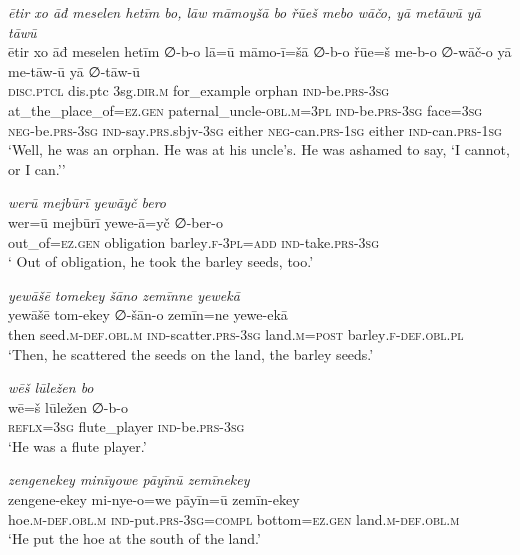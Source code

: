 \ea \label{ŽP.28}
\textit{ētir xo āđ meselen hetīm bo, lāw māmoyšā bo řūeš mebo wāčo, yā metāwū yā tāwū} \\ 
\gll ētir xo āđ meselen hetīm ∅-b-o lā=ū māmo-ī=šā ∅-b-o řūe=š me-b-o ∅-wāč-o yā me-tāw-ū yā ∅-tāw-ū \\ 
 \textsc{disc.ptcl} dis.ptc 3sg\textsc{.dir}\textsc{.m} for\_example orphan \textsc{ind-}be\textsc{.prs}\textsc{-3sg} at\_the\_place\_of\textsc{\textsc{=ez.gen}} paternal\_uncle\textsc{-obl}\textsc{.m}\textsc{=3pl} \textsc{ind-}be\textsc{.prs}\textsc{-3sg} face\textsc{=3sg} \textsc{neg-}be\textsc{.prs}\textsc{-3sg} \textsc{ind-}say\textsc{.prs}.sbjv\textsc{-3sg} either \textsc{neg-}can\textsc{.prs}\textsc{-\textsc{1sg}} either \textsc{ind-}can\textsc{.prs}\textsc{-\textsc{1sg}} \\ 
\glt `Well, he was an orphan. He was at his uncle’s. He was ashamed to say, ‘I cannot, or I can.’'
\z 
 
\ea \label{ŽP.29}
\textit{werū mejbūrī yewāyč bero} \\ 
\gll wer=ū mejbūrī yewe-ā=yč ∅-ber-o \\ 
 out\_of\textsc{\textsc{=ez.gen}} obligation barley\textsc{.f}\textsc{-3pl}\textsc{=add} \textsc{ind-}take\textsc{.prs}\textsc{-3sg} \\ 
\glt ` Out of obligation, he took the barley seeds, too.'
\z 
 
\ea \label{ŽP.32}
\textit{yewāšē tomekey šāno zemīnne yewekā} \\ 
\gll yewāšē tom-ekey ∅-šān-o zemīn=ne yewe-ekā \\ 
 then seed\textsc{.m}\textsc{-def}\textsc{.obl}\textsc{.m} \textsc{ind-}scatter\textsc{.prs}\textsc{-3sg} land\textsc{.m}\textsc{=\textsc{post}} barley\textsc{.f}\textsc{-def}\textsc{.obl}\textsc{.pl} \\ 
\glt `Then, he scattered the seeds on the land, the barley seeds.'
\z 
 
\ea \label{ŽP.33}
\textit{wēš lūležen bo} \\ 
\gll wē=š lūležen ∅-b-o \\ 
 \textsc{reflx}\textsc{=3sg} flute\_player \textsc{ind-}be\textsc{.prs}\textsc{-3sg} \\ 
\glt `He was a flute player.'
\z 
 
\ea \label{ŽP.34}
\textit{zengenekey minīyowe pāyīnū zemīnekey} \\ 
\gll zengene-ekey mi-nye-o=we pāyīn=ū zemīn-ekey \\ 
 hoe\textsc{.m}\textsc{-def}\textsc{.obl}\textsc{.m} \textsc{ind-}put\textsc{.prs}\textsc{-3sg}\textsc{=compl} bottom\textsc{\textsc{=ez.gen}} land\textsc{.m}\textsc{-def}\textsc{.obl}\textsc{.m} \\ 
\glt `He put the hoe at the south of the land.'
\z 
 
